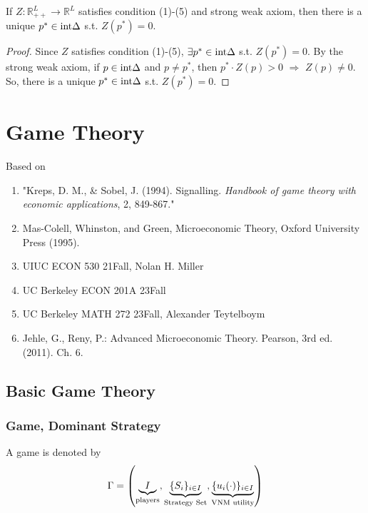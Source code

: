 \documentclass[11pt]{elegantbook}
\begin{document}
\begin{theorem}
    If $Z: \mathbb{R}_{++}^L \rightarrow \mathbb{R}^L$ satisfies condition (1)-(5) and strong weak axiom, then there is a unique $p^*\in \textnormal{int}\Delta$ s.t. $Z(p^*)=0$.
\end{theorem}
\begin{proof}
    Since $Z$ satisfies condition (1)-(5), $\exists p^*\in \textnormal{int}\Delta$ s.t. $Z(p^*)=0$. By the strong weak axiom, if $p\in \textnormal{int}\Delta$ and $p\neq p^*$, then $p^*\cdot Z(p)>0$ $\Rightarrow$ $Z(p)\neq 0$. So, there is a unique $p^*\in \textnormal{int}\Delta$ s.t. $Z(p^*)=0$.
\end{proof}





















\chapter{Game Theory}
Based on
\begin{enumerate}[$\circ$]
    \item "Kreps, D. M., \& Sobel, J. (1994). Signalling. \textit{Handbook of game theory with economic applications}, 2, 849-867."
    \item Mas-Colell, Whinston, and Green, Microeconomic Theory, Oxford University Press (1995).
    \item UIUC ECON 530 21Fall, Nolan H. Miller
    \item UC Berkeley ECON 201A 23Fall
    \item UC Berkeley MATH 272 23Fall, Alexander Teytelboym
    \item  Jehle, G., Reny, P.: Advanced Microeconomic Theory. Pearson, 3rd ed. (2011). Ch. 6.
\end{enumerate}



\section{Basic Game Theory}

\subsection{Game, Dominant Strategy}
A game is denoted by $$\Gamma =\left(\underbrace{I}_{\textnormal{players}},\underbrace{\{S_i\}_{i\in I}}_{\textnormal{Strategy Set}},\underbrace{\{u_i(\cdot)\}_{i\in I}}_{\textnormal{VNM utility}}\right)$$
\end{document}
